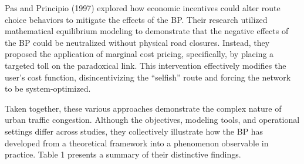 Pas and Principio (1997) explored how economic incentives could alter route choice behaviors to mitigate the effects of the BP. Their research utilized mathematical equilibrium modeling to demonstrate that the negative effects of the BP could be neutralized without physical road closures. Instead, they proposed the application of marginal cost pricing, specifically, by placing a targeted toll on the paradoxical link. This intervention effectively modifies the user's cost function, disincentivizing the “selfish” route and forcing the network to be system-optimized.

Taken together, these various approaches demonstrate the complex nature of urban traffic congestion. Although the objectives, modeling tools, and operational settings differ across studies, they collectively illustrate how the BP has developed from a theoretical framework into a phenomenon observable in practice.  Table 1 presents a summary of their distinctive findings.

